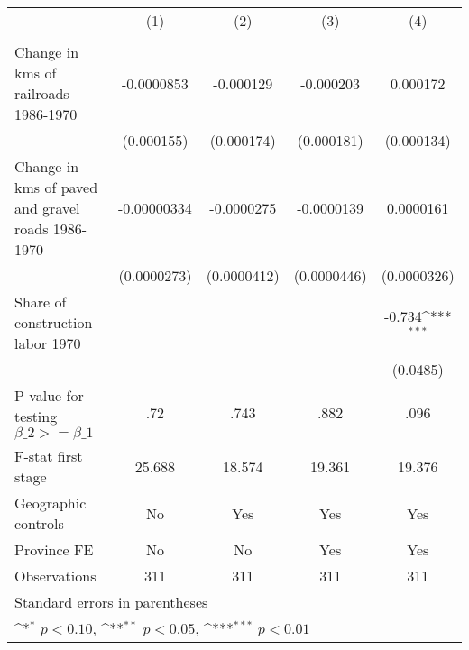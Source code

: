 {
\def\sym#1{\ifmmode^{#1}\else\(^{#1}\)\fi}
\begin{tabular}{l*{4}{c}}
\hline\hline
                &\multicolumn{1}{c}{(1)}&\multicolumn{1}{c}{(2)}&\multicolumn{1}{c}{(3)}&\multicolumn{1}{c}{(4)}\\
                &\multicolumn{1}{c}{}&\multicolumn{1}{c}{}&\multicolumn{1}{c}{}&\multicolumn{1}{c}{}\\
\hline
Change in kms of railroads 1986-1970&-0.0000853         &-0.000129         &-0.000203         & 0.000172         \\
                &(0.000155)         &(0.000174)         &(0.000181)         &(0.000134)         \\
[1em]
Change in kms of paved and gravel roads 1986-1970&-0.00000334         &-0.0000275         &-0.0000139         &0.0000161         \\
                &(0.0000273)         &(0.0000412)         &(0.0000446)         &(0.0000326)         \\
[1em]
Share of construction labor 1970&                  &                  &                  &   -0.734\sym{***}\\
                &                  &                  &                  & (0.0485)         \\
\hline
P-value for testing $\beta\_{2} >= \beta\_{1}$&      .72         &     .743         &     .882         &     .096         \\
F-stat first stage&   25.688         &   18.574         &   19.361         &   19.376         \\
Geographic controls&       No         &      Yes         &      Yes         &      Yes         \\
Province FE     &       No         &       No         &      Yes         &      Yes         \\
Observations    &      311         &      311         &      311         &      311         \\
\hline\hline
\multicolumn{5}{l}{\footnotesize Standard errors in parentheses}\\
\multicolumn{5}{l}{\footnotesize \sym{*} \(p<0.10\), \sym{**} \(p<0.05\), \sym{***} \(p<0.01\)}\\
\end{tabular}
}
